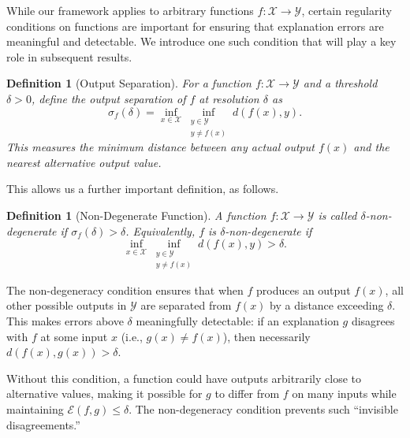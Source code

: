 \documentclass[11pt,letter,leqno]{article}
\newtheorem{definition}[theorem]{Definition}
\begin{document}
While our framework applies to arbitrary functions $f: \mathcal{X} \to \mathcal{Y}$, 
certain regularity conditions on functions are important for ensuring that 
explanation errors are meaningful and detectable. We introduce one such condition 
that will play a key role in subsequent results.

\begin{definition}[Output Separation]
\label{def:output-separation}
For a function $f: \mathcal{X} \to \mathcal{Y}$ and a threshold $\delta > 0$, 
define the \emph{output separation} of $f$ at resolution $\delta$ as
\[
\sigma_f(\delta) = \inf_{x \in \mathcal{X}} \inf_{\substack{y \in \mathcal{Y} \\ 
y \neq f(x)}} d(f(x), y).
\]
This measures the minimum distance between any actual output $f(x)$ and the 
nearest alternative output value.
\end{definition}

This allows us a further important definition, as follows.

\begin{definition}[Non-Degenerate Function]
\label{def:non-degenerate-early}
A function $f: \mathcal{X} \to \mathcal{Y}$ is called \emph{$\delta$-non-degenerate} 
if $\sigma_f(\delta) > \delta$. Equivalently, $f$ is $\delta$-non-degenerate if
\[
\inf_{x \in \mathcal{X}} \inf_{\substack{y \in \mathcal{Y} \\ y \neq f(x)}} 
d(f(x), y) > \delta.
\]
\end{definition}

The non-degeneracy condition ensures that when $f$ produces an output $f(x)$, 
all other possible outputs in $\mathcal{Y}$ are separated from $f(x)$ by a 
distance exceeding $\delta$. This makes errors above $\delta$ meaningfully 
detectable: if an explanation $g$ disagrees with $f$ at some input $x$ (i.e., 
$g(x) \neq f(x)$), then necessarily $d(f(x), g(x)) > \delta$.

Without this condition, a function could have outputs arbitrarily close to 
alternative values, making it possible for $g$ to differ from $f$ on many inputs 
while maintaining $\mathcal{E}(f,g) \leq \delta$. The non-degeneracy condition 
prevents such ``invisible disagreements.''
\end{document}

